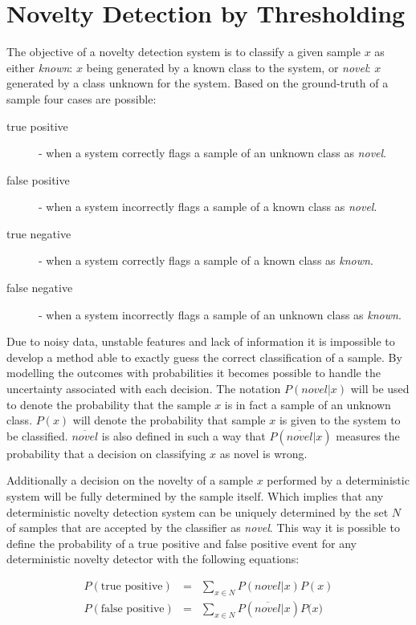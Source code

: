 \section{Novelty Detection by Thresholding}
The objective of a novelty detection system is to classify a given sample $x$ as
either \emph{known}: $x$ being generated by a known class to the system, or \emph{novel}:
$x$ generated by a class unknown for the system.
Based on the ground\hyp{}truth of a sample four cases are possible:

\begin{description}
\item[true positive]  - when a system correctly   flags a sample of an unknown class as \emph{novel}.
\item[false positive] - when a system incorrectly flags a sample of a known class as \emph{novel}.
\item[true negative]  - when a system correctly   flags a sample of a known class as \emph{known}.
\item[false negative] - when a system incorrectly flags a sample of an unknown class as \emph{known}.
\end{description}

Due to noisy data, unstable features and lack of information it is impossible to develop
a method able to exactly guess the correct classification of a sample.
By modelling the outcomes with probabilities it becomes possible to handle the uncertainty
associated with each decision.
The notation $P(novel|x)$ will be used to denote the probability that the sample $x$ is in fact a
sample of an unknown class. $P(x)$ will denote the probability that sample $x$ is given to the
system to be classified. $\overline{novel}$ is also defined in such a way that
$P(\overline{novel}|x)$ measures the probability that a decision on classifying $x$ as novel is
wrong.

Additionally a decision on the novelty of a sample $x$ performed by a deterministic system
will be fully determined by the sample itself.
Which implies that any deterministic novelty detection system can be uniquely determined by the set $N$
of samples that are accepted by the classifier as \emph{novel}.
This way it is possible to define the probability of a true positive and false positive event for any
deterministic novelty detector with the following equations:

\begin{eqnarray}
P(\text{true positive})  &=& \sum_{x \in N}{P(novel|x)P(x)} \\
P(\text{false positive}) &=& \sum_{x \in N}{P(\overline{novel}|x)P(x})
\end{eqnarray}

